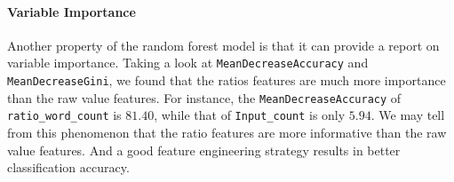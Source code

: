 \documentclass{article}
\begin{document}
\paragraph{Variable Importance}
Another property of the random forest model is that it can provide a report on variable importance. 
Taking a look at \texttt{MeanDecreaseAccuracy} and \texttt{MeanDecreaseGini}, 
we found that the ratios features are much more importance than the raw value features. 
For instance, the \texttt{MeanDecreaseAccuracy} of \texttt{ratio\_word\_count} is $81.40$, 
while that of \texttt{Input\_count} is only $5.94$. We may tell from this phenomenon that
the ratio features are more informative than the raw value features. 
And a good feature engineering strategy results in better classification accuracy. 
\end{document}
